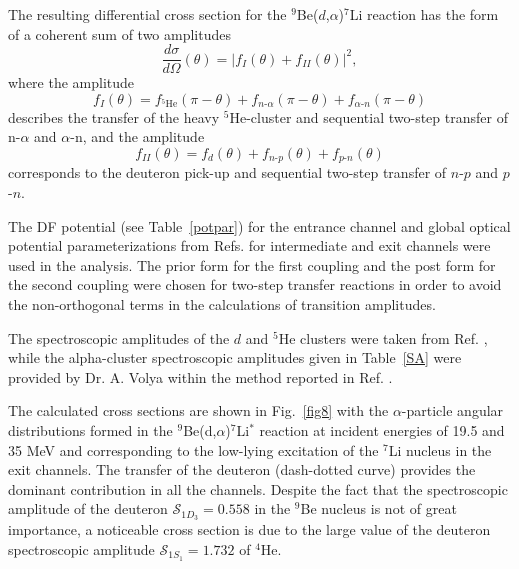 \documentclass[
12pt, %
oneside, %
english, %
onehalfspacing, %
headsepline, %
]{MastersDoctoralThesis} %
\begin{document}
The resulting differential cross section for the ${^9}$Be($d$,$\alpha$)${}^7$Li reaction has the form of a coherent sum of two amplitudes
\begin{equation}
\frac{d\sigma}{d\Omega}(\theta) =\vert f_{I}(\theta) + f_{II}(\theta) \vert ^2,
\end{equation}
where the amplitude
\begin{equation} \label{eq:ampl1}
f_{I}(\theta)=f_{{}^5\textrm{He}}(\pi - \theta) + f_{n\textrm{-}\alpha}(\pi - \theta) + f_{\alpha\textrm{-}n}(\pi - \theta)
\end{equation}
describes the transfer of the heavy ${}^5$He-cluster and sequential two-step transfer of n-$\alpha$ and $\alpha$-n, and the amplitude
\begin{equation} \label{eq:ampl2}
f_{II}(\theta)=f_{d}(\theta) + f_{n\textrm{-}p}( \theta) + f_{p\textrm{-}n}(\theta)
\end{equation}
corresponds to the deuteron pick-up and sequential two-step transfer of $n$-$p$ and $p$-$n$.



The DF potential (see Table~\ref{potpar}) for the entrance channel and global optical potential parameterizations from Refs. \cite{globalTriton, globalAlpha, global6Li} for intermediate and exit channels were used in the analysis.
The prior form for the first coupling and the post form for the second coupling were chosen for two-step transfer reactions in order to avoid the non-orthogonal terms in the calculations of transition amplitudes.

The spectroscopic amplitudes of the $d$ and ${}^5$He clusters were taken from Ref. \cite{fiveSA}, while the alpha-cluster spectroscopic amplitudes given in Table~\ref{SA} were provided by Dr. A. Volya within the method reported in Ref. \cite{volya2017}.

The calculated cross sections are shown in Fig.~\ref{fig8} with the $\alpha$-particle angular distributions formed in the ${}^9$Be(d,$\alpha$)${}^7$Li$^*$ reaction at incident energies of 19.5 and 35 MeV and corresponding to the low-lying excitation of the ${}^7$Li nucleus in the exit channels. The transfer of the deuteron (dash-dotted curve) provides the dominant contribution in all the channels. Despite the fact that the spectroscopic amplitude of the deuteron $\mathcal{S}_{1{D}_3}=0.558$ in the ${}^9$Be nucleus is not of great importance, a noticeable cross section is due to the large value of the deuteron spectroscopic amplitude $\mathcal{S}_{1{S}_1}=1.732$  of ${}^4$He.
\end{document}
